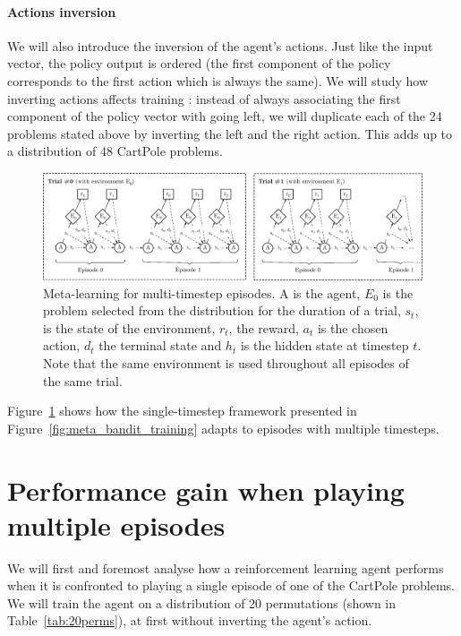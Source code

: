 \paragraph{Actions inversion} We will also introduce the inversion of the
agent's actions. Just like the input vector, the policy output is ordered
(the first component of the policy corresponds to the first action which is
always the same). We will study how inverting actions affects training : instead
of always associating the first component of the policy vector with going left,
we will duplicate each of the 24 problems stated above by inverting the left
and the right action. This adds up to a distribution of 48 CartPole problems.\\

\begin{figure}
	\centering
	\includegraphics[width=\linewidth]{fig/meta_cartpole.eps}
	\caption{Meta-learning for multi-timestep episodes. A is the agent,
	$E_0$ is the problem selected from the distribution for the duration
	of a trial, $s_t$, is the state of the environment, $r_t$, the reward,
	$a_t$ is the chosen action, $d_t$ the terminal state and $h_t$ is
	the hidden state at timestep $t$. Note that the same environment is
	used throughout all episodes of the same trial.}
	\label{fig:meta_cartpole}
\end{figure}

Figure~\ref{fig:meta_cartpole} shows how the single-timestep framework
presented in Figure~\ref{fig:meta_bandit_training} adapts to episodes
with multiple timesteps.

\section{Performance gain when playing multiple episodes}

We will first and foremost analyse how a reinforcement learning agent 
performs when it is confronted to playing a single episode of one of the 
CartPole problems. We will train the agent on a distribution of 20 permutations
(shown in Table~\ref{tab:20perms}), at first without inverting the agent's
action.\\

